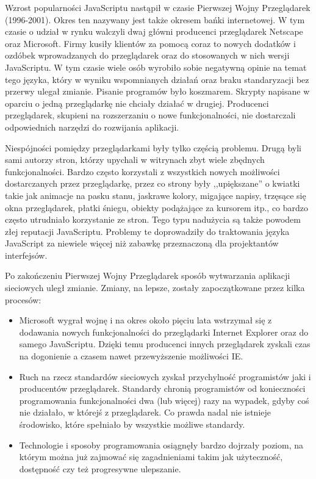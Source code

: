 Wzrost popularności JavaScriptu nastąpił w czasie Pierwszej Wojny Przeglądarek (1996-2001)\cite{stefanov10}. Okres ten nazywany jest także okresem bańki internetowej. W tym czasie o udział w rynku walczyli dwaj główni producenci przeglądarek Netscape oraz Microsoft. Firmy kusiły klientów za pomocą coraz to nowych dodatków i ozdóbek wprowadzanych do przeglądarek oraz do stosowanych w nich wersji JavaScriptu. W tym czasie wiele osób wyrobiło sobie negatywną opinie na temat tego języka, który w wyniku wspomnianych działań oraz braku standaryzacji bez przerwy ulegał zmianie. Pisanie programów było koszmarem. Skrypty napisane w oparciu o jedną przeglądarkę nie chciały działać w drugiej. Producenci przeglądarek, skupieni na rozszerzaniu o nowe funkcjonalności, nie dostarczali odpowiednich narzędzi do rozwijania aplikacji\cite{stefanov10}.

Niespójności pomiędzy przeglądarkami były tylko częścią problemu. Drugą byli sami autorzy stron, którzy upychali w witrynach zbyt wiele zbędnych funkcjonalności. Bardzo często korzystali z wszystkich nowych możliwości dostarczanych przez przeglądarkę, przez co strony były ,,upiększane'' o kwiatki takie jak animacje na pasku stanu, jaskrawe kolory, migające napisy, trzęsące się okna przeglądarek, płatki śniegu, obiekty podążające za kursorem itp., co bardzo często utrudniało korzystanie ze stron. Tego typu nadużycia są także powodem złej reputacji JavaScriptu. Problemy te doprowadziły do traktowania języka JavaScript za niewiele więcej niż zabawkę przeznaczoną dla projektantów interfejsów. 


Po zakończeniu Pierwszej Wojny Przeglądarek sposób wytwarzania aplikacji sieciowych uległ zmianie. Zmiany, na lepsze, zostały zapoczątkowane przez kilka procesów\cite{stefanov10}: 
\begin{itemize}
 \item Microsoft wygrał wojnę i na okres około pięciu lata wstrzymał się z dodawania nowych funkcjonalności do przeglądarki Internet Explorer oraz do samego JavaScriptu. Dzięki temu producenci innych przeglądarek zyskali czas na dogonienie a czasem nawet przewyższenie możliwości IE.
 \item Ruch na rzecz standardów sieciowych zyskał przychylność programistów jaki i producentów przeglądarek. Standardy chronią programistów od konieczności programowania funkcjonalności dwa (lub więcej) razy na wypadek, gdyby coś nie działało, w którejś z przeglądarek. Co prawda nadal nie istnieje środowisko, które spełniało by wszystkie możliwe standardy.
 \item Technologie i sposoby programowania osiągnęły bardzo dojrzały poziom, na którym można już zajmować się zagadnieniami takim jak użyteczność, dostępność czy też progresywne ulepszanie. 
\end{itemize}

